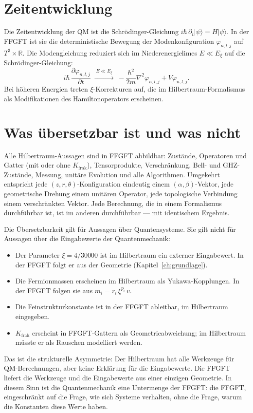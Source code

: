 \section{Zeitentwicklung}

Die Zeitentwicklung der QM ist die Schrödinger-Gleichung
$i\hbar\,\partial_t|\psi\rangle = H|\psi\rangle$. In der FFGFT ist sie die
deterministische Bewegung der Modenkonfiguration $\varphi_{n,l,j}$ auf
$T^3\times\mathbb{R}$. Die Modengleichung reduziert sich im
Niederenergielimes $E\ll E_\xi$ auf die Schrödinger-Gleichung:
\begin{equation}
  i\hbar\,\frac{\partial\varphi_{n,l,j}}{\partial t}
  \;\xrightarrow{\;E\ll E_\xi\;}\;
  -\frac{\hbar^2}{2m}\nabla^2\varphi_{n,l,j}+V\varphi_{n,l,j}.
\end{equation}
Bei höheren Energien treten $\xi$-Korrekturen auf, die im
Hilbertraum-Formalismus als Modifikationen des Hamiltonoperators
erscheinen.

\section{Was übersetzbar ist und was nicht}

Alle Hilbertraum-Aussagen sind in FFGFT abbildbar: Zustände, Operatoren
und Gatter (mit oder ohne $K_{\mathrm{frak}}$), Tensorprodukte,
Verschränkung, Bell- und GHZ-Zustände, Messung, unitäre Evolution und
alle Algorithmen. Umgekehrt entspricht jede $(z,r,\theta)$-Konfiguration
eindeutig einem $(\alpha,\beta)$-Vektor, jede geometrische Drehung einem
unitären Operator, jede topologische Verbindung einem verschränkten
Vektor. Jede Berechnung, die in einem Formalismus durchführbar ist, ist
im anderen durchführbar --- mit identischem Ergebnis.

Die Übersetzbarkeit gilt für Aussagen über Quantensysteme. Sie gilt
nicht für Aussagen über die Eingabewerte der Quantenmechanik:
\begin{itemize}
  \item Der Parameter $\xi = 4/30000$ ist im Hilbertraum ein externer
        Eingabewert. In der FFGFT folgt er aus der Geometrie
        (Kapitel~\ref{ch:grundlage}).
  \item Die Fermionmassen erscheinen im Hilbertraum als Yukawa-Kopplungen.
        In der FFGFT folgen sie aus $m_i = r_i\,\xi^{p_i}\,v$.
  \item Die Feinstrukturkonstante ist in der FFGFT ableitbar, im
        Hilbertraum eingegeben.
  \item $K_{\mathrm{frak}}$ erscheint in FFGFT-Gattern als
        Geometrieabweichung; im Hilbertraum müsste er als Rauschen
        modelliert werden.
\end{itemize}
Das ist die strukturelle Asymmetrie: Der Hilbertraum hat alle Werkzeuge
für QM-Berechnungen, aber keine Erklärung für die Eingabewerte. Die FFGFT
liefert die Werkzeuge und die Eingabewerte aus einer einzigen Geometrie.
In diesem Sinn ist die Quantenmechanik eine Untermenge der FFGFT: die
FFGFT, eingeschränkt auf die Frage, wie sich Systeme verhalten, ohne die
Frage, warum die Konstanten diese Werte haben.

